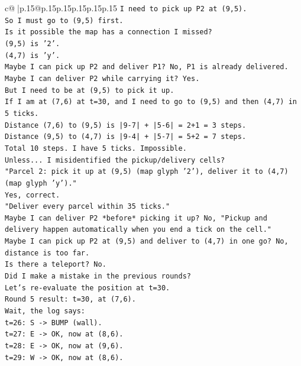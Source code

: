 \documentclass{article}
\begin{document}
{\begin{supertabular}{c@{$\;$}|p{.15\linewidth}@{}p{.15\linewidth}p{.15\linewidth}p{.15\linewidth}p{.15\linewidth}p{.15\linewidth}}
{{{\texttt{I need to pick up P2 at (9,5).} \\
\texttt{So I must go to (9,5) first.} \\
\texttt{Is it possible the map has a connection I missed?} \\
\texttt{(9,5) is '2'.} \\
\texttt{(4,7) is 'y'.} \\
\texttt{Maybe I can pick up P2 and deliver P1? No, P1 is already delivered.} \\
\texttt{Maybe I can deliver P2 while carrying it? Yes.} \\
\texttt{But I need to be at (9,5) to pick it up.} \\
\texttt{If I am at (7,6) at t=30, and I need to go to (9,5) and then (4,7) in 5 ticks.} \\
\texttt{Distance (7,6) to (9,5) is |9{-}7| + |5{-}6| = 2+1 = 3 steps.} \\
\texttt{Distance (9,5) to (4,7) is |9{-}4| + |5{-}7| = 5+2 = 7 steps.} \\
\texttt{Total 10 steps. I have 5 ticks. Impossible.} \\
\texttt{Unless... I misidentified the pickup/delivery cells?} \\
\texttt{"Parcel 2: pick it up at (9,5) (map glyph '2'), deliver it to (4,7) (map glyph 'y')."} \\
\texttt{Yes, correct.} \\
\texttt{"Deliver every parcel within 35 ticks."} \\
\texttt{Maybe I can deliver P2 *before* picking it up? No, "Pickup and delivery happen automatically when you end a tick on the cell."} \\
\texttt{Maybe I can pick up P2 at (9,5) and deliver to (4,7) in one go? No, distance is too far.} \\
\texttt{Is there a teleport? No.} \\
\texttt{Did I make a mistake in the previous rounds?} \\
\texttt{Let's re{-}evaluate the position at t=30.} \\
\texttt{Round 5 result: t=30, at (7,6).} \\
\texttt{Wait, the log says:} \\
\texttt{t=26: S {-}> BUMP (wall).} \\
\texttt{t=27: E {-}> OK, now at (8,6).} \\
\texttt{t=28: E {-}> OK, now at (9,6).} \\
\texttt{t=29: W {-}> OK, now at (8,6).} \\
}}}
\end{supertabular}}
\end{document}

